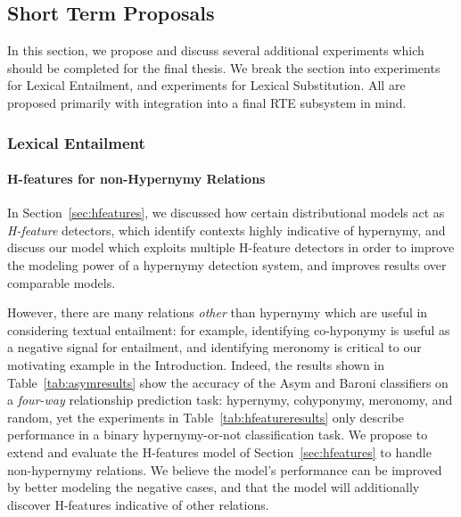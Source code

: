 \documentclass[12pt]{article}
\begin{document}
\subsection{Short Term Proposals}

In this section, we propose and discuss several additional experiments which
should be completed for the final thesis. We break the section into experiments
for Lexical Entailment, and experiments for Lexical Substitution. All are
proposed primarily with integration into a final RTE subsystem in mind.

\subsubsection{Lexical Entailment}

\paragraph{H-features for non-Hypernymy Relations}

In Section~\ref{sec:hfeatures}, we discussed how certain distributional models
act as {\em H-feature} detectors, which identify contexts highly indicative
of hypernymy, and discuss our model which exploits
multiple H-feature detectors in order to improve the
modeling power of a hypernymy detection system, and improves results over
comparable models.

However, there are many relations {\em other} than hypernymy which are useful
in considering textual entailment: for example, identifying co-hyponymy is
useful as a negative signal for entailment, and identifying meronomy is
critical to our motivating example in the Introduction.
Indeed, the results shown in Table~\ref{tab:asymresults} show
the accuracy of the Asym and Baroni classifiers on a {\em four-way} relationship
prediction task: hypernymy, cohyponymy, meronomy, and random, yet the
experiments in Table~\ref{tab:hfeatureresults} only describe performance in a
binary hypernymy-or-not classification task. We propose to extend and evaluate
the H-features model of Section~\ref{sec:hfeatures} to handle non-hypernymy
relations. We believe the model's performance can be improved by
better modeling the negative cases, and that the model will additionally
discover H-features indicative of other relations.
\end{document}
